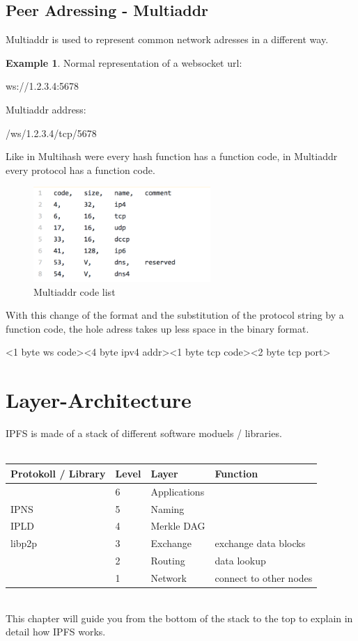 \documentclass[a4paper,11pt, oneside]{report}
\theoremstyle{definition}
\newtheorem{exmp}{Example}[subsection]
\begin{document}
\section{Peer Adressing - Multiaddr}
Multiaddr is used to represent common network adresses in a different way.
\begin{exmp}
Normal representation of a websocket url: 
\begin{center}
ws://1.2.3.4:5678\\
\end{center}
Multiaddr address:
\begin{center}
/ws/1.2.3.4/tcp/5678
\end{center}
\end{exmp}
\noindent
Like in Multihash were every hash function has a function code, in Multiaddr every protocol has a function code. \\
\begin{figure}[H]
\centering
\includegraphics[width=0.6\textwidth]{img/multiaddr.png}
\caption[Multiaddr code list]{Multiaddr code list}
\end{figure}
\noindent
With this change of the format and the substitution of the protocol string by a function code, the hole adress takes up less space in the binary format.
\begin{center}
<1 byte ws code><4 byte ipv4 addr><1 byte tcp code><2 byte tcp port>
\end{center}
\newpage

\chapter{Layer-Architecture}
IPFS is made of a stack of different software moduels / libraries.\\ \\
\noindent
\begin{tabularx}{\textwidth}{XXXl}
Protokoll / Library&Level & Layer & Function\\ \hline
&6& Applications & \\ \hline
IPNS  &5 & Naming & \\ \hline
IPLD&4 & Merkle DAG &\\ \hline
libp2p&3 & Exchange & exchange data blocks\\ 
&2 & Routing  & data lookup\\
&1 & Network  & connect to other nodes \\ \hline
\end{tabularx}\\[0.2cm]
This chapter will guide you from the bottom of the stack to the top to explain in detail how IPFS works.
\end{document}
